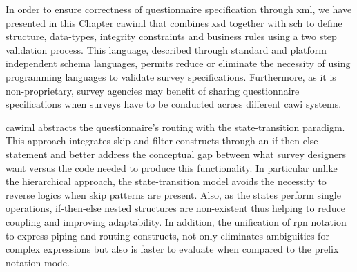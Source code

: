 	In order to ensure correctness of questionnaire specification through \gls{xml}, we have presented in this Chapter \gls{cawiml} that combines \gls{xsd} together with \gls{sch} to define structure, data-types, integrity constraints and business rules using a two step validation process. This language, described through standard and platform independent schema languages, permits reduce or eliminate the necessity of using programming languages to validate survey specifications. Furthermore, as it is non-proprietary, survey agencies may benefit of sharing questionnaire specifications when surveys have to be conducted across different \gls{cawi} systems.

	\gls{cawiml} abstracts the questionnaire's routing with the state-transition paradigm. This approach integrates skip and filter constructs through an if-then-else statement and better address the conceptual gap between what survey designers want versus the code needed to produce this functionality. In particular unlike the hierarchical approach, the state-transition model avoids the necessity to reverse logics when skip patterns are present. Also, as the states perform single operations, if-then-else nested structures are non-existent thus helping to reduce coupling and improving adaptability. In addition, the unification of \gls{rpn} notation to express piping and routing constructs, not only eliminates ambiguities for complex expressions but also is faster to evaluate when compared to the prefix notation mode.

